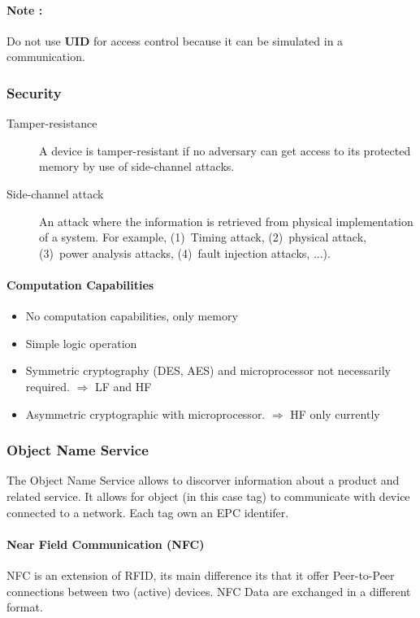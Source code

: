 \paragraph{Note :} Do not use \textbf{UID} for access control because
it can be simulated in a communication.

\subsubsection{Security}

\begin{description}
    \item[Tamper-resistance] A device is tamper-resistant if no adversary can
    get access to its protected memory by use of side-channel attacks.
    \item[Side-channel attack] An attack where the information is
        retrieved from physical implementation of a system. For example,
        (1)~Timing attack, (2)~physical attack, (3)~power analysis
        attacks, (4)~fault injection attacks, ...).
\end{description}

\paragraph{Computation Capabilities}
\begin{itemize}
    \item No computation capabilities, only memory
    \item Simple logic operation
    \item Symmetric cryptography (DES, AES) and microprocessor not
        necessarily required. $\Rightarrow$ LF and HF
    \item Asymmetric cryptographic with microprocessor.
        $\Rightarrow$ HF only currently
\end{itemize}

\subsubsection{Object Name Service}
 The Object Name Service allows to discorver information about a product and related
 service. It allows for object (in this case tag) to communicate with device connected to 
 a network. Each tag own an EPC identifer.

\paragraph{Near Field Communication (NFC)}
NFC is an extension of RFID, its main difference its that it offer
Peer-to-Peer connections between two (active) devices. NFC Data are exchanged
in a different format.


